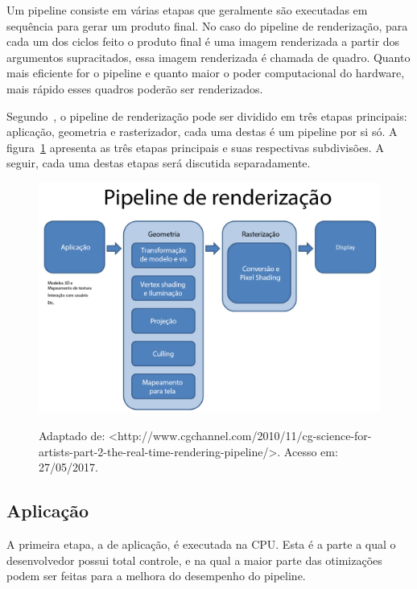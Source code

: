 Um pipeline consiste em várias etapas que geralmente são executadas em sequência para 
gerar um produto final. No caso do pipeline de renderização, para cada um dos ciclos 
feito o produto final é uma imagem renderizada a partir dos argumentos supracitados, essa 
imagem renderizada é chamada de quadro. Quanto mais eficiente for o pipeline e quanto 
maior o poder computacional do hardware, mais rápido esses quadros poderão ser 
renderizados.

Segundo~\cite{akenine2008real}, o pipeline de renderização pode ser dividido em três 
etapas principais: aplicação, geometria e rasterizador, cada uma destas é um pipeline por 
si só. A figura~\ref{renderingpipelinerep} apresenta as três etapas principais e suas 
respectivas subdivisões. A seguir, cada uma destas etapas será discutida separadamente.

\begin{figure}[h]
    \centering
    \includegraphics[width =.8\textwidth]{../figuras/renderingpipeline}
    \par\medskip
    Adaptado de: <http://www.cgchannel.com/2010/11/cg-science-for-artists-part-2-the-real-time-rendering-pipeline/>. 
    Acesso em: 27/05/2017.
    \label{renderingpipelinerep}
\end{figure}

\subsection{Aplicação}

A primeira etapa, a de aplicação, é executada na CPU\@. Esta é a parte a qual o 
desenvolvedor possui total controle, e na qual a maior parte das otimizações podem ser 
feitas para a melhora do desempenho do pipeline. 

